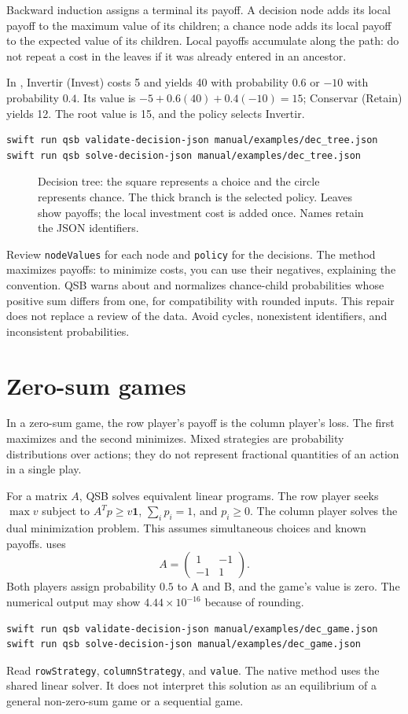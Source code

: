 Backward induction assigns a terminal its payoff. A decision node adds its
local payoff to the maximum value of its children; a chance node adds its
local payoff to the expected value of its children. Local payoffs accumulate
along the path: do not repeat a cost in the leaves if it was already entered
in an ancestor.

In , Invertir (Invest) costs 5 and yields 40 with
probability $0.6$ or $-10$ with probability $0.4$. Its value is
$-5+0.6(40)+0.4(-10)=15$; Conservar (Retain) yields 12. The root value is
15, and the policy selects Invertir.
\begin{lstlisting}
swift run qsb validate-decision-json manual/examples/dec_tree.json
swift run qsb solve-decision-json manual/examples/dec_tree.json
\end{lstlisting}
\begin{figure}[H]
\centering

\caption{Decision tree: the square represents a choice and the circle represents chance. The thick branch is the selected policy. Leaves show payoffs; the local investment cost is added once. Names retain the JSON identifiers.}
\label{fig:decision-tree}
\end{figure}

Review \texttt{nodeValues} for each node and \texttt{policy} for the decisions.
The method maximizes payoffs: to minimize costs, you can use their negatives,
explaining the convention. QSB warns about and normalizes chance-child
probabilities whose positive sum differs from one, for compatibility with
rounded inputs. This repair does not replace a review of the data. Avoid cycles,
nonexistent identifiers, and inconsistent probabilities.

\section{Zero-sum games}
In a zero-sum game, the row player's payoff is the column player's loss. The
first maximizes and the second minimizes. Mixed strategies are probability
distributions over actions; they do not represent fractional quantities of an
action in a single play.

For a matrix $A$, QSB solves equivalent linear programs. The row player seeks
$\max v$ subject to $A^Tp\geq v\mathbf{1}$, $\sum_i p_i=1$, and $p_i\geq0$.
The column player solves the dual minimization problem. This assumes simultaneous
choices and known payoffs.  uses
\[
 A=\begin{pmatrix}1&-1\\-1&1\end{pmatrix}.
\]
Both players assign probability $0.5$ to A and B, and the game's value is
zero. The numerical output may show $4.44\times10^{-16}$ because of rounding.
\begin{lstlisting}
swift run qsb validate-decision-json manual/examples/dec_game.json
swift run qsb solve-decision-json manual/examples/dec_game.json
\end{lstlisting}
Read \texttt{rowStrategy}, \texttt{columnStrategy}, and \texttt{value}. The
native method uses the shared linear solver. It does not interpret this solution
as an equilibrium of a general non-zero-sum game or a sequential game.

